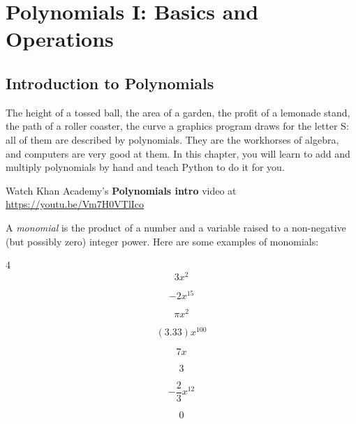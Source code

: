 \chapter{Polynomials I: Basics and Operations}


\section{Introduction to Polynomials}
The height of a tossed ball, the area of a garden, the profit of a lemonade
stand, the path of a roller coaster, the curve a graphics program draws
for the letter S: all of them are described by polynomials. They are the
workhorses of algebra, and computers are very good at them. In this
chapter, you will learn to add and multiply polynomials by hand and teach
Python to do it for you.

Watch Khan Academy's \textbf{Polynomials intro} video at \url{https://youtu.be/Vm7H0VTlIco}

A \emph{monomial} is the product of a number and a variable raised to a non-negative (but possibly zero) integer power. Here are some examples of monomials:
\begin{multicols}{4}
  \begin{equation*}
    3 x^2
  \end{equation*}

  \begin{equation*}
    -2 x^{15}
  \end{equation*}

  \begin{equation*}
    \pi x^2
  \end{equation*}

  \begin{equation*}
    (3.33)x^{100}
  \end{equation*}

  \begin{equation*}
    7x
  \end{equation*}

  \begin{equation*}
    3
  \end{equation*}

  \begin{equation*}
    -\frac{2}{3}x^{12}
  \end{equation*}

  \begin{equation*}
    0
  \end{equation*}

  
\end{multicols}

